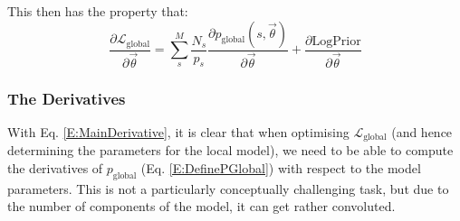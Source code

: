 \documentclass[fleqn,usenatbib]{mnras}
\newcommand{\eref}[1]{Eq. \eqref{#1}}
\newcommand{\pdiv}[2]{\frac{\partial #1}{\partial #2}}
\begin{document}
{{					This then has the property that:
					\begin{equation}
						\pdiv{\mathcal{L}_\text{global}}{\vec{\theta}} = \sum_s^M \frac{N_s}{{p}_s}  \pdiv{p_\text{global}(s,\vec{\theta})}{\vec{\theta}} + \pdiv{\text{LogPrior}}{\vec{\theta}}\label{E:MainDerivative}
					\end{equation}
					
			
				\subsubsection{The Derivatives}

					With \eref{E:MainDerivative}, it is clear that when optimising $\mathcal{L}_\text{global}$ (and hence determining the parameters for the local model), we need to be able to compute the derivatives of $p_\text{global}$ (\eref{E:DefinePGlobal}) with respect to the model parameters. This is not a particularly conceptually challenging task, but due to the number of components of the model, it can get rather convoluted.
				
}}
\end{document}
